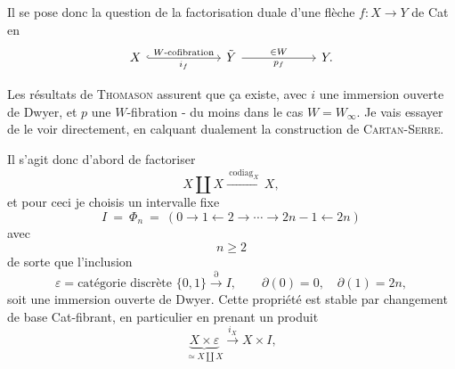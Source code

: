 \documentclass[11pt]{article}
\newcommand{\printedpage}[1]{\marginpar{\footnotesize p.~#1}}
\newcommand{\msp}[1]{\marginpar{\footnotesize [#1]}}
\begin{document}
\printedpage{145}

\msp{page 228}
Il se pose donc la question de la factorisation duale d'une flèche $f : X \longrightarrow Y$ de Cat en
\[
\begin{tikzcd}[ampersand replacement=\&, column sep=6em]
X \arrow[r, hook, "W\text{-cofibration}", "i_f"'] \& \tilde{Y} \arrow[r, "\in W", "p_f"'] \& Y.
\end{tikzcd}
\]

Les résultats de \textsc{Thomason} assurent que ça existe, avec $i$ une immersion ouverte de Dwyer, et $p$ une $W$-fibration - du moins dans le cas $W = W_\infty$. Je vais essayer de le voir directement, en calquant dualement la construction de \textsc{Cartan-Serre}.

Il s'agit donc d'abord de factoriser
\[
X \amalg X \xrightarrow{\ \mathrm{codiag}_X\ } X,
\]
et pour ceci je choisis un intervalle fixe
\[
I \ = \ \Phi_n \ = \ (0 \longrightarrow 1 \longleftarrow 2 \longrightarrow \cdots \longrightarrow 2n-1 \longleftarrow 2n)
\]
avec
\[
n \geq 2
\]
de sorte que l'inclusion
\[
\varepsilon = \text{catégorie discrète } \{0,1\} \xrightarrow{\partial} I, \qquad \partial(0) = 0, \quad \partial(1) = 2n,
\]
soit une immersion ouverte de Dwyer. Cette propriété est stable par changement de base Cat-fibrant, en particulier en prenant un produit
\[
\underbrace{X \times \varepsilon}_{\simeq X \coprod X} \xrightarrow{i_X} X \times I,
\]
\begingroup\renewcommand{\thefootnote}{}\endgroup
\end{document}
